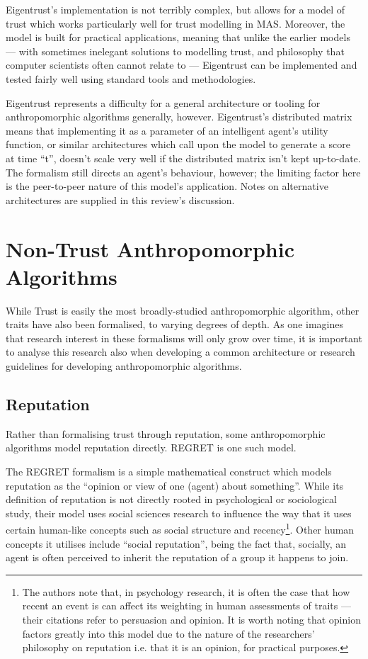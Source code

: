 \documentclass[11pt,english,twocolumn]{article}
\begin{document}
Eigentrust's implementation is not terribly complex, but allows for a model of trust which works particularly well for trust modelling in MAS. Moreover, the model is built for practical applications, meaning that unlike the earlier models --- with sometimes inelegant solutions to modelling trust, and philosophy that computer scientists often cannot relate to --- Eigentrust can be implemented and tested fairly well using standard tools and methodologies.\par

Eigentrust represents a difficulty for a general architecture or tooling for anthropomorphic algorithms generally, however. Eigentrust's distributed matrix means that implementing it as a parameter of an intelligent agent's utility function, or similar architectures which call upon the model to generate a score at time ``t'', doesn't scale very well if the distributed matrix isn't kept up-to-date. The formalism still directs an agent's behaviour, however; the limiting factor here is the peer-to-peer nature of this model's application. Notes on alternative architectures are supplied in this review's discussion.\par

\section{Non-Trust Anthropomorphic Algorithms}
While Trust is easily the most broadly-studied anthropomorphic algorithm, other traits have also been formalised, to varying degrees of depth. As one imagines that research interest in these formalisms will only grow over time, it is important to analyse this research also when developing a common architecture or research guidelines for developing anthropomorphic algorithms.\par


\subsection{Reputation}
Rather than formalising trust through reputation, some anthropomorphic algorithms model reputation directly. REGRET\cite{Sabater} is one such model.\par

The REGRET formalism is a simple mathematical construct which models reputation as the ``opinion or view of one (agent) about something''\cite{Sabater}. While its definition of reputation is not directly rooted in psychological or sociological study, their model uses social sciences research to influence the way that it uses certain human-like concepts such as social structure and recency\footnote{The authors note that, in psychology research, it is often the case that how recent an event is can affect its weighting in human assessments of traits --- their citations refer to persuasion and opinion. It is worth noting that opinion factors greatly into this model due to the nature of the researchers' philosophy on reputation i.e. that it is an opinion, for practical purposes.}. Other human concepts it utilises include ``social reputation'', being the fact that, socially, an agent is often perceived to inherit the reputation of a group it happens to join.\par
\end{document}

